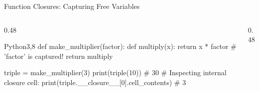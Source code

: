 \begin{frame}[fragile]{Function Closures: Capturing Free Variables}
  \begin{columns}[T,onlytextwidth]
    \begin{column}{0.48\textwidth}
      \begin{HighlightedCodeBlock}{Python}{3,8}
def make_multiplier(factor):
    def multiply(x):
        return x * factor  # 'factor' is captured!
    return multiply

triple = make_multiplier(3)
print(triple(10))  # 30
# Inspecting internal closure cell:
print(triple.__closure__[0].cell_contents) # 3
      \end{HighlightedCodeBlock}
    \end{column}
    \begin{column}{0.48\textwidth}
      \centering
      \DrawClosureCellDiagram
    \end{column}
  \end{columns}
  \vspace{0.15cm}
\end{frame}

